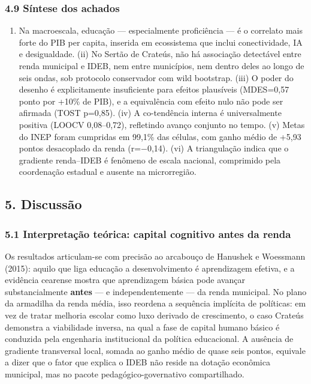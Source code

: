 \documentclass[
  brazilian,
  12pt,
  a4paper,
]{article}
\providecommand{\tightlist}{%
  \setlength{\itemsep}{0pt}\setlength{\parskip}{0pt}}
\begin{document}
\subsubsection{4.9 Síntese dos achados}\label{suxedntese-dos-achados}

\begin{enumerate}
\def\labelenumi{(\roman{enumi})}
\tightlist
\item
  Na macroescala, educação --- especialmente proficiência --- é o
  correlato mais forte do PIB per capita, inserida em ecossistema que
  inclui conectividade, IA e desigualdade. (ii) No Sertão de Crateús,
  não há associação detectável entre renda municipal e IDEB, nem entre
  municípios, nem dentro deles ao longo de seis ondas, sob protocolo
  conservador com wild bootstrap. (iii) O poder do desenho é
  explicitamente insuficiente para efeitos plausíveis (MDES=0,57 ponto
  por +10\% de PIB), e a equivalência com efeito nulo não pode ser
  afirmada (TOST p=0,85). (iv) A co-tendência interna é universalmente
  positiva (LOOCV 0,08--0,72), refletindo avanço conjunto no tempo. (v)
  Metas do INEP foram cumpridas em 99,1\% das células, com ganho médio
  de +5,93 pontos desacoplado da renda (r=−0,14). (vi) A triangulação
  indica que o gradiente renda--IDEB é fenômeno de escala nacional,
  comprimido pela coordenação estadual e ausente na microrregião.
\end{enumerate}

\subsection{5. Discussão}\label{discussuxe3o}

\subsubsection{5.1 Interpretação teórica: capital cognitivo antes da
renda}\label{interpretauxe7uxe3o-teuxf3rica-capital-cognitivo-antes-da-renda}

Os resultados articulam-se com precisão ao arcabouço de Hanushek e
Woessmann (2015): aquilo que liga educação a desenvolvimento é
aprendizagem efetiva, e a evidência cearense mostra que aprendizagem
básica pode avançar substancialmente \textbf{antes} --- e
independentemente --- da renda municipal. No plano da armadilha da renda
média, isso reordena a sequência implícita de políticas: em vez de
tratar melhoria escolar como luxo derivado de crescimento, o caso
Crateús demonstra a viabilidade inversa, na qual a fase de capital
humano básico é conduzida pela engenharia institucional da política
educacional. A ausência de gradiente transversal local, somada ao ganho
médio de quase seis pontos, equivale a dizer que o fator que explica o
IDEB não reside na dotação econômica municipal, mas no pacote
pedagógico-governativo compartilhado.
\end{document}
